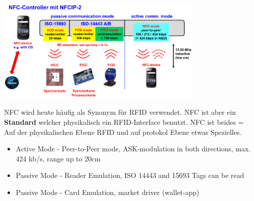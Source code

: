 	\begin{minipage}{10cm}
		\includegraphics[width=10cm]{./bilder/rfid-nfc.png} 
	\end{minipage}
			
	NFC wird heute häufig als Synonym für RFID verwendet. NFC ist aber ein \textbf{Standard} welcher physikalisch ein RFID-Interface benutzt. 
	NFC ist beides = Auf der physikalischen Ebene RFID und auf protokol Ebene etwas Spezielles.
	\begin{itemize}
		\item Active Mode - Peer-to-Peer mode, ASK-modulation in both directions, max. 424 kb/s, range up to 20cm
		\item Passive Mode - Reader Emulation, ISO 14443 and 15693 Tags can be read
		\item Passive Mode - Card Emulation, market driver (wallet-app)
	\end{itemize}
	
	